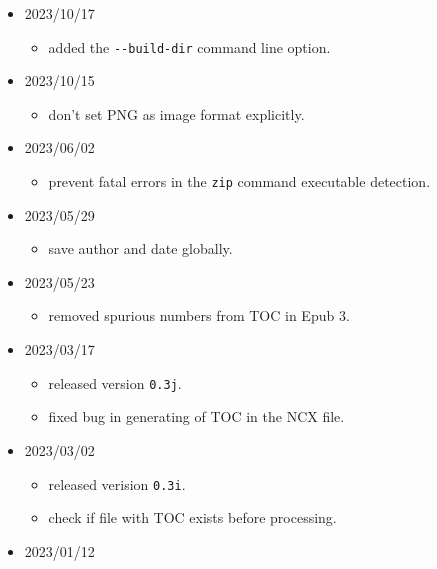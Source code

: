 \begin{itemize}
  \begin{itemize}
  \tightlist
  \item
    added the \texttt{\textbackslash{}epubpage} command
  \end{itemize}
\item
  2023/10/17

  \begin{itemize}
  \tightlist
  \item
    added the \texttt{-\/-build-dir} command line option.
  \end{itemize}
\item
  2023/10/15

  \begin{itemize}
  \tightlist
  \item
    don't set PNG as image format explicitly.
  \end{itemize}
\item
  2023/06/02

  \begin{itemize}
  \tightlist
  \item
    prevent fatal errors in the \texttt{zip} command executable
    detection.
  \end{itemize}
\item
  2023/05/29

  \begin{itemize}
  \tightlist
  \item
    save author and date globally.
  \end{itemize}
\item
  2023/05/23

  \begin{itemize}
  \tightlist
  \item
    removed spurious numbers from TOC in Epub 3.
  \end{itemize}
\item
  2023/03/17

  \begin{itemize}
  \tightlist
  \item
    released version \texttt{0.3j}.
  \item
    fixed bug in generating of TOC in the NCX file.
  \end{itemize}
\item
  2023/03/02

  \begin{itemize}
  \tightlist
  \item
    released verision \texttt{0.3i}.
  \item
    check if file with TOC exists before processing.
  \end{itemize}
\item
  2023/01/12


\end{itemize}
